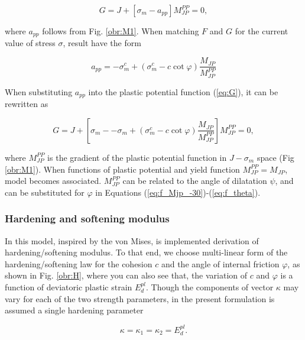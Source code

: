\begin{equation}\label{eq:G}
	G = J + \left[ \sigma_m - a_{pp} \right] M_{JP}^{PP} = 0,
\end{equation}

where $a_{pp}$ follows from Fig. \ref{obr:M1}. When matching $F$ and $G$ for the current value of stress $\sigma$, result have the form

\begin{equation}\label{eq:app}
	a_{pp} = - \sigma_m^c + ( \sigma_m^c - c\cot\varphi) \dfrac{M_{JP}}{M_{JP}^{PP}}
\end{equation} 

When substituting $a_{pp}$ into the plastic potential function (\ref{eq:G}), it can be rewritten as 

\begin{equation}\label{eq:plastic_potential}
	G = J + \left[ \sigma_m - - \sigma_m + ( \sigma_m^c - c\cot\varphi) \dfrac{M_{JP}}{M_{JP}^{PP}} \right] M_{JP}^{PP} = 0,
\end{equation}

where $M_{JP}^{PP}$ is the gradient of the plastic potential function in $J-\sigma_m$ space (Fig \ref{obr:M1}). When functions of plastic potential and yield function  $M_{JP}^{PP}=M_{JP}$, model becomes associated. $M_{JP}^{PP}$  can be related to the angle of dilatation $\psi$, and can be substituted for $\varphi$ in Equations (\ref{eq:f_Mjp_-30})-(\ref{eq:f_theta}).
 
\subsubsection{Hardening and softening modulus}
\indent

In this model, inspired by the von Mises, is implemented derivation of hardening/softening modulus. To that end, we choose multi-linear form of the hardening/softening law for the cohesion $c$ and the angle of internal friction $\varphi$, as shown in Fig. \ref{obr:H}, where you can also see that, the variation of $c$ and $\varphi$ is a function of deviatoric plastic strain $E_d^{pl}$. Though the components of vector $\kappa$ may vary for each of the two strength parameters, in the present formulation is assumed a single hardening parameter

\begin{equation}\label{eq:kappa}
	\kappa = \kappa_{1} = \kappa_{2} = E_d^{pl}.
\end{equation}

